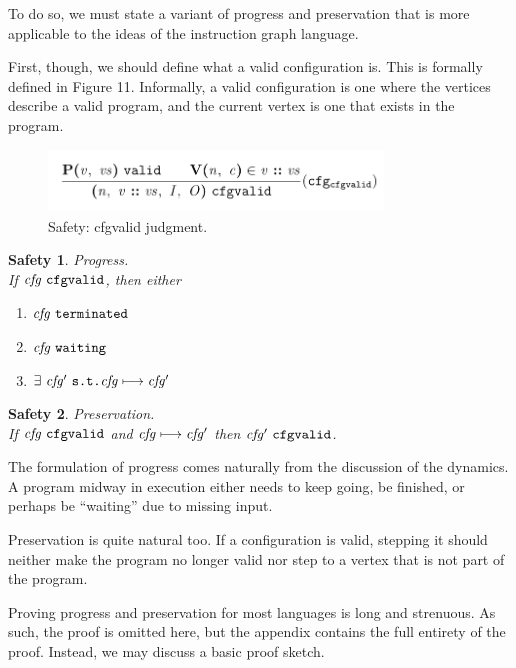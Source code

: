 \documentclass{sig-alternate-05-2015}
\begin{document}
To do so, we must state a variant of progress and preservation that is more
applicable to the ideas of the instruction graph language.

First, though, we should define what a valid configuration is. This is formally
defined in Figure 11. Informally, a valid configuration is one where the
vertices describe a valid program, and the current vertex is one that exists in
the program.

\begin{figure}
\centering
\includegraphics[height=0.65in, width=3.5in]{images/cfgvalid.png}
\caption{Safety: cfgvalid judgment.}
\end{figure}

\newtheorem{theorem}{Safety}
\begin{theorem}
Progress.\\
If $\mathit{cfg}\ \mathtt{cfgvalid}$, then either
\begin{enumerate}
  \item $\mathit{cfg}\ \mathtt{terminated}$
  \item $\mathit{cfg}\ \mathtt{waiting}$
  \item $\exists\ \nterm{cfg'}\ \texttt{s.t.} \steps{\nterm{cfg}}{\nterm{cfg'}}$
\end{enumerate}
\end{theorem}

\begin{theorem}
Preservation.\\
If $\mathit{cfg}\ \mathtt{cfgvalid}$ and $\mathit{cfg} \longmapsto \mathit{cfg'}$ then
$\mathit{cfg'}\ \mathtt{cfgvalid}$.
\end{theorem}

The formulation of progress comes naturally from the discussion of the dynamics.
A program midway in execution either needs to keep going, be finished, or
perhaps be ``waiting'' due to missing input.

Preservation is quite natural too. If a configuration is valid, stepping it
should neither make the program no longer valid nor step to a vertex that is not
part of the program.

Proving progress and preservation for most languages is long and strenuous. As
such, the proof is omitted here, but the appendix contains the full entirety of
the proof. Instead, we may discuss a basic proof sketch.
\end{document}
